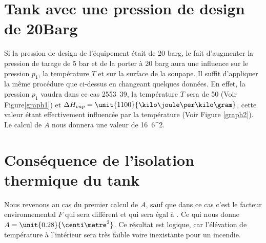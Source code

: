 \section{Tank avec une pression de design de \unit{20}{Barg}}
Si la pression de design de l’équipement était de 20 barg, le fait d’augmenter la pression de tarage de 5 bar et de la porter à 20 barg aura une influence sur le pression $p_1$, la température $T$ et sur la surface de la soupape.
Il suffit d'appliquer la même procédure que ci-dessus en changeant quelques données. En effet, la pression $p_1$ vaudra dans ce cas \unit{2553.39}{\kilo \pascal}, la température $T$ sera de \unit{50}{\celsius} (Voir Figure\ref{graph1}) et $\Delta H_{vap}=\unit{1100}{\kilo \joule \per \kilo \gram}$, cette valeur étant effectivement influencée par la température (Voir Figure \ref{graph2}). Le calcul de $A$ nous donnera une valeur de \unit{16.6}{\centi \metre^2}.

\section{Conséquence de l'isolation thermique du tank}

Nous revenons au cas du premier calcul de $A$, sauf que dans ce cas c'est le facteur environnemental $F$ qui sera différent et qui sera égal à . Ce qui nous donne $A=\unit{0.28}{\centi \metre^2}$. Ce résultat est logique, car l'élévation de température à l'intérieur sera très faible voire inexistante pour un incendie.
